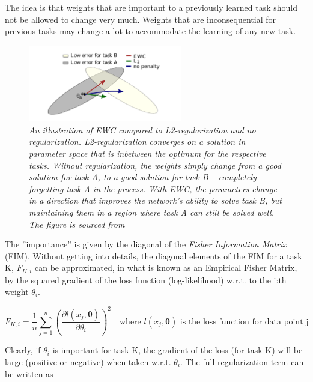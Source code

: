 \documentclass{article}
\begin{document}
        The idea is that weights that are important to a previously learned task
        should not be allowed to change very much. Weights that are 
        inconsequential for previous tasks may change a lot to accommodate the 
        learning of any new task. 

        \begin{figure}[H]
            \centering
            \includegraphics[width=0.6\textwidth]{figures/ewc_illustration.png}
            \caption{\textit{An illustration of EWC compared to L2-regularization and 
            no regularization. L2-regularization converges on a solution 
            in parameter space that is inbetween the optimum for the respective
            tasks. Without regularization, the weights simply change from 
            a good solution for task A, to a good solution for task B -- 
            completely forgetting task A in the process. With EWC, the parameters
            change in a direction that improves the network's ability to solve 
            task B, but maintaining them in a region where task A can still be 
            solved well. The figure is sourced from \cite{kirkpatrick2017overcoming}}}
        \end{figure}
        
        
        The ''importance'' is given by the diagonal 
        of the \textit{Fisher Information Matrix} (FIM). Without getting into 
        details, the diagonal elements of the FIM for a task K, $F_{K,i}$ can be
        approximated, in what is known as an Empirical Fisher Matrix, by the 
        squared gradient of the loss function (log-likelihood) w.r.t. to the 
        i:th weight $\theta_i$.

        \begin{equation*}
            F_{K,i} = \frac{1}{n}\sum_{j = 1}^{n}{\left(\frac{\partial l(x_j, \boldsymbol{\theta})}{\partial \theta_i}\right)^2}\quad
            \text{where $l(x_j, \boldsymbol{\theta})$ is the loss function for data point j}
        \end{equation*}
        
        Clearly, if $\theta_i$ is important for task K, the gradient of the loss
        (for task K) will be large (positive or negative) when taken w.r.t. 
        $\theta_i$. The full regularization term can be written as 
\end{document}

